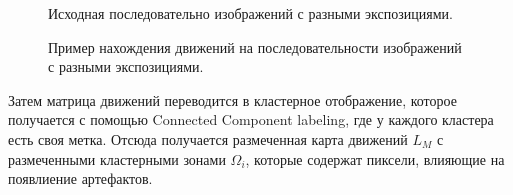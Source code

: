 \begin{figure}[!tbp]
\begin{minipage}[b]{.2\textwidth}
    \caption{ Исходная последовательно изображений с разными экспозициями.}
  \end{minipage}
  \caption { Пример нахождения движений на последовательности изображений с разными экспозициями.}
  \label{fig:bmdExample}
\end{figure}

Затем матрица движений переводится в кластерное отображение, которое получается с помощью Connected Component labeling, где у каждого кластера есть своя метка. Отсюда получается размеченная карта движений $L_M$ с размеченными кластерными зонами $\Omega_i$, которые содержат пиксели, влияющие на появлиение артефактов.
